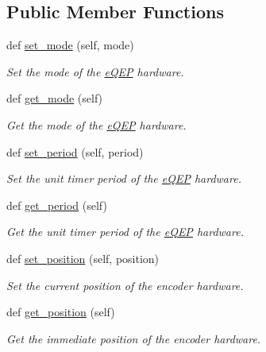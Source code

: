 \subsection*{Public Member Functions}
\begin{DoxyCompactItemize}
\item 
def \hyperlink{classeqep_1_1eQEP_ab214d60b7425c1d7803e3dff282b4255}{set\+\_\+mode} (self, mode)
\begin{DoxyCompactList}\small\item\em Set the mode of the \hyperlink{classeqep_1_1eQEP}{e\+Q\+EP} hardware. \end{DoxyCompactList}\item 
def \hyperlink{classeqep_1_1eQEP_a0b00fff3014216779db96333c76c41d9}{get\+\_\+mode} (self)
\begin{DoxyCompactList}\small\item\em Get the mode of the \hyperlink{classeqep_1_1eQEP}{e\+Q\+EP} hardware. \end{DoxyCompactList}\item 
def \hyperlink{classeqep_1_1eQEP_af025879aa5f70b38b8309de87c06df43}{set\+\_\+period} (self, period)
\begin{DoxyCompactList}\small\item\em Set the unit timer period of the \hyperlink{classeqep_1_1eQEP}{e\+Q\+EP} hardware. \end{DoxyCompactList}\item 
def \hyperlink{classeqep_1_1eQEP_a21826fd1f1b7524fe3883e25f619de1f}{get\+\_\+period} (self)
\begin{DoxyCompactList}\small\item\em Get the unit timer period of the \hyperlink{classeqep_1_1eQEP}{e\+Q\+EP} hardware. \end{DoxyCompactList}\item 
def \hyperlink{classeqep_1_1eQEP_a4cc40a4f3989be38ae46e427e09dfb04}{set\+\_\+position} (self, position)
\begin{DoxyCompactList}\small\item\em Set the current position of the encoder hardware. \end{DoxyCompactList}\item 
def \hyperlink{classeqep_1_1eQEP_aec4ddf0439a2df98e527b2963925d397}{get\+\_\+position} (self)
\begin{DoxyCompactList}\small\item\em Get the immediate position of the encoder hardware. \end{DoxyCompactList}\item 

\end{DoxyCompactItemize}

